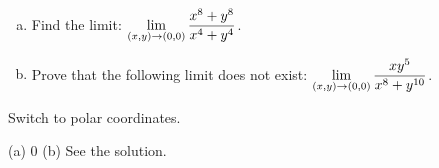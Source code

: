 \begin{question}[M253 2009D] %
\begin{enumerate}[(a)]
\item
Find the limit: $\displaystyle \lim_{(x,y)\to(0,0)}\frac{x^8+y^8}{x^4+y^4}$.
\item
Prove that the following limit does not exist: 
  $\displaystyle \lim_{(x,y)\to(0,0)}\frac{xy^5}{x^8+y^{10}}$.
\end{enumerate}
\end{question}

\begin{hint}
Switch to polar coordinates.
\end{hint}

\begin{answer}
(a) $0$
\qquad
(b) See the solution.
\end{answer}

